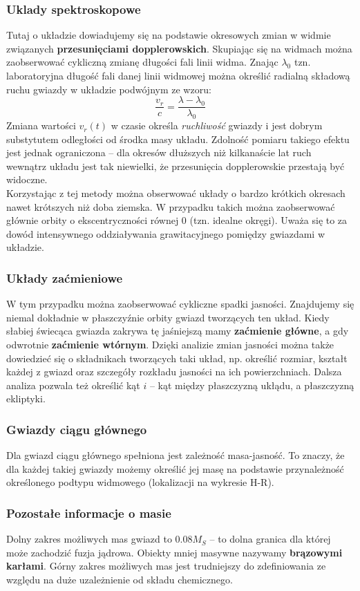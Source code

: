 \documentclass[../index.tex]{subfiles}
\begin{document}
            \subsubsection{Uklady spektroskopowe}
                Tutaj o układzie dowiadujemy się na podstawie okresowych zmian w widmie związanych \textbf{przesunięciami dopplerowskich}. Skupiając się na widmach można zaobserwować cykliczną zmianę długości fali linii widma. Znając \(\lambda_0\) tzn. laboratoryjna długość fali danej linii widmowej można określić radialną składową ruchu gwiazdy w układzie podwójnym ze wzoru:
                \begin{equation}
                    \frac{v_r}{c}  = \frac{\lambda -\lambda_0}{\lambda_0} 
                \end{equation} 
                Zmiana wartości \(v_r(t)\) w czasie określa \textit{ruchliwość} gwiazdy i jest dobrym substytutem odległości od środka masy układu. Zdolność pomiaru takiego efektu jest jednak ograniczona \--- dla okresów dłuższych niż kilkanaście lat ruch wewnątrz układu jest tak niewielki, że przesunięcia dopplerowskie przestają być widoczne.\\
                Korzystając z tej metody można obserwować układy o bardzo krótkich okresach nawet krótszych niż doba ziemska. W przypadku takich można zaobserwować głównie orbity o ekscentryczności równej 0 (tzn. idealne okręgi). Uważa się to za dowód intensywnego oddziaływania grawitacyjnego pomiędzy gwiazdami w układzie.
            \subsubsection{Układy zaćmieniowe}
                W tym przypadku można zaobserwować cykliczne spadki jasności. Znajdujemy się niemal dokładnie w płaszczyźnie orbity gwiazd tworzących ten układ. Kiedy słabiej świecąca gwiazda zakrywa tę jaśniejszą mamy \textbf{zaćmienie główne}, a gdy odwrotnie \textbf{zaćmienie wtórnym}. Dzięki analizie zmian jasności można także dowiedzieć się o składnikach tworzących taki układ, np. określić rozmiar, kształt każdej z gwiazd oraz szczegóły rozkładu jasności na ich powierzchniach. Dalsza analiza pozwala też określić kąt \(i\) \--- kąt między płaszczyzną ukłądu, a płaszczyzną ekliptyki.
            \subsubsection{Gwiazdy ciągu głównego}
                Dla gwiazd ciągu głównego spełniona jest zależność masa-jasność. To znaczy, że dla każdej takiej gwiazdy możemy określić jej masę na podstawie przynależność określonego podtypu widmowego (lokalizacji na wykresie H-R).
            \subsubsection{Pozostałe informacje o masie}
                Dolny zakres możliwych mas gwiazd to \(0.08 M_S\) \--- to dolna granica dla której może zachodzić fuzja jądrowa. Obiekty mniej masywne nazywamy \textbf{brązowymi karłami}. Górny zakres możliwych mas jest trudniejszy do zdefiniowania ze względu na duże uzależnienie od składu chemicznego.
\end{document}

